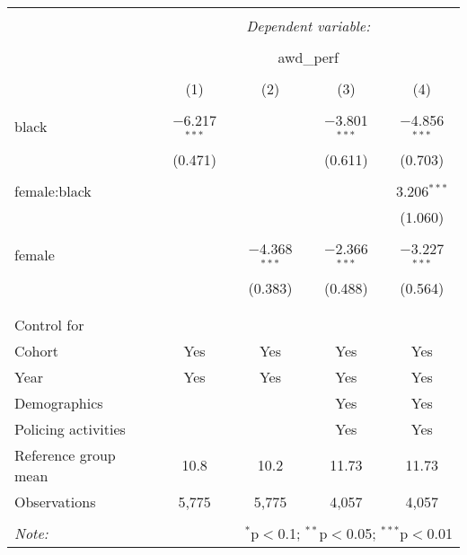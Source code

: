 
\begin{table}[!htbp] \centering 
  \caption{} 
  \label{} 
\begin{tabular}{@{\extracolsep{5pt}}lcccc} 
\\[-1.8ex]\hline 
\hline \\[-1.8ex] 
 & \multicolumn{4}{c}{\textit{Dependent variable:}} \\ 
\cline{2-5} 
\\[-1.8ex] & \multicolumn{4}{c}{awd\_perf} \\ 
\\[-1.8ex] & (1) & (2) & (3) & (4)\\ 
\hline \\[-1.8ex] 
 black & $-$6.217$^{***}$ &  & $-$3.801$^{***}$ & $-$4.856$^{***}$ \\ 
  & (0.471) &  & (0.611) & (0.703) \\ 
  & & & & \\ 
 female:black &  &  &  & 3.206$^{***}$ \\ 
  &  &  &  & (1.060) \\ 
  & & & & \\ 
 female &  & $-$4.368$^{***}$ & $-$2.366$^{***}$ & $-$3.227$^{***}$ \\ 
  &  & (0.383) & (0.488) & (0.564) \\ 
  & & & & \\ 
\hline \\[-1.8ex] 
Control for &  &  &  &  \\ 
Cohort & Yes & Yes & Yes & Yes \\ 
Year & Yes & Yes & Yes & Yes \\ 
Demographics &   &   & Yes & Yes \\ 
Policing activities &  &  & Yes & Yes \\ 
Reference group mean & 10.8 & 10.2 & 11.73 & 11.73 \\ 
Observations & 5,775 & 5,775 & 4,057 & 4,057 \\ 
\hline 
\hline \\[-1.8ex] 
\textit{Note:}  & \multicolumn{4}{r}{$^{*}$p$<$0.1; $^{**}$p$<$0.05; $^{***}$p$<$0.01} \\ 
\end{tabular} 
\end{table} 

